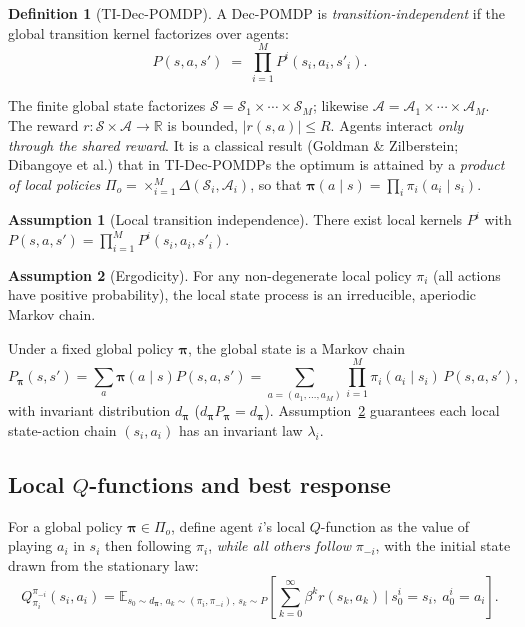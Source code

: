\documentclass[11pt]{article}
\theoremstyle{plain}
\theoremstyle{definition}
\newtheorem{definition}{Definition}
\newtheorem{assumption}{Assumption}
\newcommand{\R}{\mathbb{R}}
\newcommand{\E}{\mathbb{E}}
\newcommand{\calS}{\mathcal{S}}
\newcommand{\calA}{\mathcal{A}}
\newcommand{\bpi}{\bm{\pi}}
\begin{document}
\begin{definition}[TI-Dec-POMDP]
A Dec-POMDP is \emph{transition-independent} if the global transition kernel
factorizes over agents:
\begin{equation}
  P(s,a,s') \;=\; \prod_{i=1}^{M} P^{i}(s_i,a_i,s'_i).
  \label{eq:transindep}
\end{equation}
\end{definition}

\noindent The finite global state factorizes $\calS=\calS_1\times\cdots\times
\calS_M$; likewise $\calA=\calA_1\times\cdots\times\calA_M$. The reward
$r:\calS\times\calA\to\R$ is bounded, $|r(s,a)|\le R$. Agents interact
\emph{only through the shared reward}. It is a classical result (Goldman \&
Zilberstein; Dibangoye et al.) that in TI-Dec-POMDPs the optimum is attained
by a \emph{product of local policies} $\Pi_o=\times_{i=1}^M \Delta(\calS_i,
\calA_i)$, so that $\bpi(a\mid s)=\prod_i \pi_i(a_i\mid s_i)$.

\begin{assumption}[Local transition independence]
\label{as:trans}
There exist local kernels $P^i$ with
$P(s,a,s')=\prod_{i=1}^{M}P^i(s_i,a_i,s'_i)$.
\end{assumption}

\begin{assumption}[Ergodicity]
\label{as:ergodic}
For any non-degenerate local policy $\pi_i$ (all actions have positive
probability), the local state process is an irreducible, aperiodic Markov
chain.
\end{assumption}

\noindent Under a fixed global policy $\bpi$, the global state is a Markov chain
\begin{equation}
  P_{\bpi}(s,s')=\sum_a \bpi(a\mid s)P(s,a,s')
  =\sum_{a=(a_1,\dots,a_M)}\prod_{i=1}^M \pi_i(a_i\mid s_i)\,P(s,a,s'),
\end{equation}
with invariant distribution $d_{\bpi}$ ($d_{\bpi}P_{\bpi}=d_{\bpi}$).
Assumption~\ref{as:ergodic} guarantees each local state-action chain
$(s_i,a_i)$ has an invariant law $\lambda_i$.

\subsection{Local $Q$-functions and best response}

For a global policy $\bpi\in\Pi_o$, define agent $i$'s local $Q$-function as
the value of playing $a_i$ in $s_i$ then following $\pi_i$, \emph{while all
others follow} $\pi_{-i}$, with the initial state drawn from the stationary
law:
\begin{equation}
  Q^{\pi_{-i}}_{\pi_i}(s_i,a_i)
  = \E_{s_0\sim d_{\bpi},\, a_k\sim(\pi_i,\pi_{-i}),\, s_k\sim P}
  \!\left[\sum_{k=0}^{\infty}\beta^k r(s_k,a_k)\ \Big|\ s^i_0=s_i,\ a^i_0=a_i\right].
  \label{eq:localq}
\end{equation}
\end{document}
